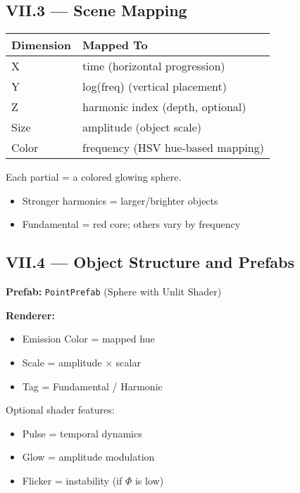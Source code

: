 \documentclass{article}
\begin{document}
\subsection*{VII.3 — Scene Mapping}

\begin{center}
\begin{tabular}{|l|l|}
\hline
\textbf{Dimension} & \textbf{Mapped To} \\
\hline
X & time (horizontal progression) \\
Y & log(freq) (vertical placement) \\
Z & harmonic index (depth, optional) \\
Size & amplitude (object scale) \\
Color & frequency (HSV hue-based mapping) \\
\hline
\end{tabular}
\end{center}

Each partial = a colored glowing sphere.

\begin{itemize}
    \item Stronger harmonics = larger/brighter objects
    \item Fundamental = red core; others vary by frequency
\end{itemize}

\subsection*{VII.4 — Object Structure and Prefabs}

\textbf{Prefab:} \texttt{PointPrefab} (Sphere with Unlit Shader)

\textbf{Renderer:}

\begin{itemize}
    \item Emission Color = mapped hue
    \item Scale = amplitude × scalar
    \item Tag = Fundamental / Harmonic
\end{itemize}

Optional shader features:

\begin{itemize}
    \item Pulse = temporal dynamics
    \item Glow = amplitude modulation
    \item Flicker = instability (if $\Phi$ is low)
\end{itemize}
\end{document}

